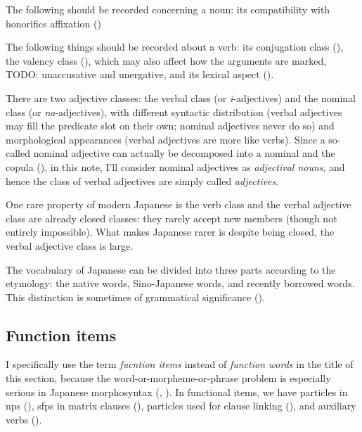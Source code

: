 \documentclass[UTF8, a4paper, oneside, scheme=plain]{ctexrep}
\newcommand*{\term}[1]{\emph{#1}}
\newcommand{\corpus}[1]{\emph{#1}}
\begin{document}
The following should be recorded concerning a noun:
its compatibility with honorifics affixation ()

The following things should be recorded about a verb:
its conjugation class (),
the valency class (),
which may also affect how the arguments are marked,
TODO: unaccusative and unergative,
and its lexical aspect ().

There are two adjective classes:
the verbal class (or \corpus{i}-adjectives)
and the nominal class (or \corpus{na}-adjectives),
with different syntactic distribution 
(verbal adjectives may fill the predicate slot on their own; nominal adjectives never do so)
and morphological appearances
(verbal adjectives are more like verbs).
Since a so-called nominal adjective 
can actually be decomposed into a nominal and the copula 
(),
in this note, I'll consider nominal adjectives as \emph{adjectival nouns},
and hence the class of verbal adjectives are simply called \emph{adjectives}.

One rare property of modern Japanese is the verb class and the verbal adjective class 
are already closed classes:
they rarely accept new members (though not entirely impossible).
What makes Japanese rarer is despite being closed,
the verbal adjective class is large.

The vocabulary of Japanese can be divided into three parts according to the etymology:
the native words,
Sino-Japanese words,
and recently borrowed words.
This distinction is sometimes of grammatical significance ().

\subsection{Function items}

I specifically use the term \term{fucntion items} instead of \term{function words}
in the title of this section,
because the word-or-morpheme-or-phrase problem is especially serious in Japanese morphosyntax
(, ).
In functional items,
we have particles in \acs{np}s (),
\acs{sfp}s in matrix clauses (),
particles used for clause linking (),
and auxiliary verbs ().
\end{document}
